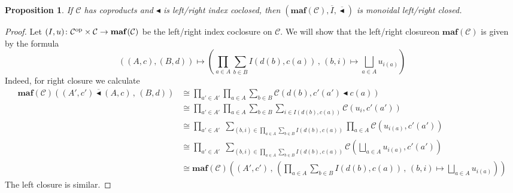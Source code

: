 \documentclass[11pt, one side, article]{memoir}
\theoremstyle{definition}
\theoremstyle{plain}
\newtheorem{proposition}[definitionx]{Proposition}
\newenvironment{remark}
  {\pushQED{\qed}\renewcommand{\qedsymbol}{$\lozenge$}\remarkx}
  {\popQED\endremarkx}
\newcommand{\cat}[1]{\mathcal{#1}}%
\newcommand{\Cat}[1]{\mathbf{#1}}%
\newcommand{\op}{^\tn{op}}
\newcommand{\tn}[1]{\textnormal{#1}}
\newcommand{\ol}[1]{\overline{#1}}
\newcommand{\smset}{\Cat{Set}}
\newcommand{\smcat}{\mathbb{C}\Cat{at}}
\newcommand{\0}{\Cat{0}}
\newcommand{\1}{\Cat{1}}
\newcommand{\olmonprod}{\mathbin{\ol{\monprod}}}
\newcommand{\monprod}{\blacktriangleleft}
\newcommand{\opfam}{\Cat{maf}}
\begin{document}
\begin{proposition}
If $\cat{C}$ has coproducts and $\monprod$ is left/right index coclosed, then $(\opfam(\cat{C}),\ol{I},\olmonprod)$ is monoidal left/right closed. 
\end{proposition}
\begin{proof}
Let $(I,u)\colon\cat{C}\op\times\cat{C}\to\opfam(\cat{C})$ be the left/right index coclosure on $\cat{C}$. We will show that the left/right closureon $\opfam(\cat{C})$ is given by the formula
\[
	((A,c),(B,d))\mapsto
	\left(\prod_{a\in A}\sum_{b\in B}I(d(b), c(a))\,,\,(b,i)\mapsto\bigsqcup_{a\in A}u_{i(a)}\right)
\]
Indeed, for right closure we calculate
\begin{align*}
	\opfam(\cat{C})((A',c')\olmonprod(A,c)\,,\,(B,d))&\cong
	\prod_{a'\in A'}\prod_{a\in A}\sum_{b\in B}\cat{C}(d(b),c'(a')\monprod c(a))\\&\cong
	\prod_{a'\in A'}\prod_{a\in A}\sum_{b\in B}\sum_{i\in I(d(b), c(a))}\cat{C}(u_i,c'(a'))\\&\cong
	\prod_{a'\in A'}\;\sum_{(b,i)\in\prod_{a\in A}\sum_{b\in B}I(d(b),c(a))}\prod_{a\in A}\cat{C}(u_{i(a)},c'(a'))\\&\cong
	\prod_{a'\in A'}\;\sum_{(b,i)\in\prod_{a\in A}\sum_{b\in B}I(d(b),c(a))}\cat{C}\left(\bigsqcup_{a\in A}u_{i(a)},c'(a')\right)\\&\cong
	\opfam(\cat{C})\left((A',c')\,,\,\left(\prod_{a\in A}\sum_{b\in B}I(d(b),c(a))\,,\,(b,i)\mapsto\bigsqcup_{a\in A}u_{i(a)}\right)\right)
	\end{align*}
The left closure is similar.
\end{proof}

\end{document}

